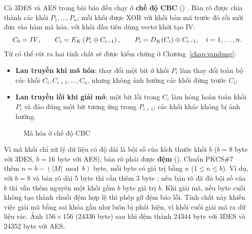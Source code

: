 Cả 3DES và AES trong bài báo đều chạy ở \textbf{chế độ CBC} ()
\cite{sp80038a}. Bản rõ được chia thành các khối $P_1, \dots, P_n$; mỗi khối được XOR với khối
bản mã trước đó rồi mới đưa vào hàm mã hóa, với khối đầu tiên dùng vectơ khởi tạo IV:
\begin{equation}
  C_0 = \mathit{IV}, \qquad C_i = E_K\left(P_i \oplus C_{i-1}\right), \qquad
  P_i = D_K(C_i) \oplus C_{i-1}, \quad i = 1, \dots, n.
  \label{eq:cbc}
\end{equation}
Từ  có thể rút ra hai tính chất sẽ được kiểm chứng ở Chương~\ref{chap:vandung}:
\begin{itemize}
  \item \textbf{Lan truyền khi mã hóa}: thay đổi một bit ở khối $P_i$ làm thay đổi toàn bộ các
        khối $C_i, C_{i+1}, \dots, C_n$, nhưng không ảnh hưởng các khối đứng trước $C_i$;
  \item \textbf{Lan truyền lỗi khi giải mã}: một bit lỗi trong $C_i$ làm hỏng hoàn toàn khối
        $P_i$ và đảo đúng một bit tương ứng trong $P_{i+1}$; các khối khác không bị ảnh hưởng.
\end{itemize}

\begin{figure}[H]
\centering
{}
\caption{Mã hóa ở chế độ CBC}
\label{fig:cbc}
\end{figure}

Vì mã khối chỉ xử lý dữ liệu có độ dài là bội số của kích thước khối $b$ ($b=8$ byte với 3DES,
$b=16$ byte với AES), bản rõ phải được \textbf{đệm} (). Chuẩn PKCS\#7
\cite{rfc5652} thêm $n = b - (|M| \bmod b)$ byte, mỗi byte có giá trị bằng $n$
($1 \le n \le b$). Ví dụ, với $b = 8$ và bản rõ dài 5 byte thì cần thêm 3 byte
; nếu bản rõ đã đủ bội số của $b$ thì vẫn thêm nguyên một khối gồm $b$ byte
giá trị $b$. Khi giải mã, nếu byte cuối không tạo thành chuỗi đệm hợp lệ thì phép gỡ đệm báo
lỗi. Tính chất này khiến việc giải mã bằng sai khóa gần như luôn bị phát hiện, vì khối cuối
giải mã ra dữ liệu rác. Ảnh $156\times156$ (\num{24336} byte) sau khi đệm thành \num{24344}
byte với 3DES và \num{24352} byte với AES.

